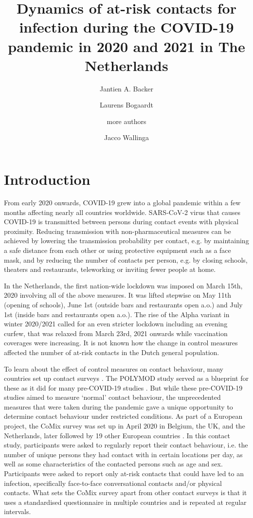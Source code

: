 \documentclass[fleqn,10pt]{wlscirep}
\title{Dynamics of at-risk contacts for infection during the COVID-19 pandemic in 2020 and 2021 in The Netherlands}
\author[1,*]{Jantien A. Backer}
\author[1]{Laurens Bogaardt}
\author[?]{more authors}
\author[1,2]{Jacco Wallinga}
\affil[1]{National Institute for Public Health and the Environment, Bilthoven, the Netherlands}
\affil[2]{Leiden University Medical Center, Leiden, the Netherlands}
\affil[*]{jantien.backer@rivm.nl}
\begin{document}
\flushbottom
\maketitle

\thispagestyle{empty}

\section*{Introduction}
From early 2020 onwards, COVID-19 grew into a global pandemic within a few months affecting nearly all countries worldwide. SARS-CoV-2 virus that causes COVID-19 is transmitted between persons during contact events with physical proximity. Reducing transmission with non-pharmaceutical measures can be achieved by lowering the transmission probability per contact, e.g. by maintaining a safe distance from each other or using protective equipment such as a face mask, and by reducing the number of contacts per person, e.g. by closing schools, theaters and restaurants, teleworking or inviting fewer people at home.

In the Netherlands, the first nation-wide lockdown was imposed on March 15th, 2020 involving all of the above measures. It was lifted stepwise on May 11th (opening of schools), June 1st (outside bars and restaurants open a.o.) and July 1st (inside bars and restaurants open a.o.). The rise of the Alpha variant in winter 2020/2021 called for an even stricter lockdown including an evening curfew, that was relaxed from March 23rd, 2021 onwards while vaccination coverages were increasing. It is not known how the change in control measures affected the number of at-risk contacts in the Dutch general population.

To learn about the effect of control measures on contact behaviour, many countries set up contact surveys \cite{Zhang_2020, Latsuzbaia_2020, Quaife_2020, Backer_2021, Bosetti_2021, Feehan_2021, Tomori_2021, Drolet_2022}. The POLYMOD study \cite{Mossong_2008} served as a blueprint for these as it did for many pre-COVID-19 studies \cite{Hoang_2019}. But while these pre-COVID-19 studies aimed to measure `normal' contact behaviour, the unprecedented measures that were taken during the pandemic gave a unique opportunity to determine contact behaviour under restricted conditions. As part of a European project, the CoMix survey was set up in April 2020 in Belgium, the UK, and the Netherlands, later followed by 19 other European countries \cite{Verelst_2021}. In this contact study, participants were asked to regularly report their contact behaviour, i.e. the number of unique persons they had contact with in certain locations per day, as well as some characteristics of the contacted persons such as age and sex. Participants were asked to report only at-risk contacts that could have led to an infection, specifically face-to-face conversational contacts and/or physical contacts. What sets the CoMix survey apart from other contact surveys is that it uses a standardised questionnaire in multiple countries and is repeated at regular intervals.
\end{document}
